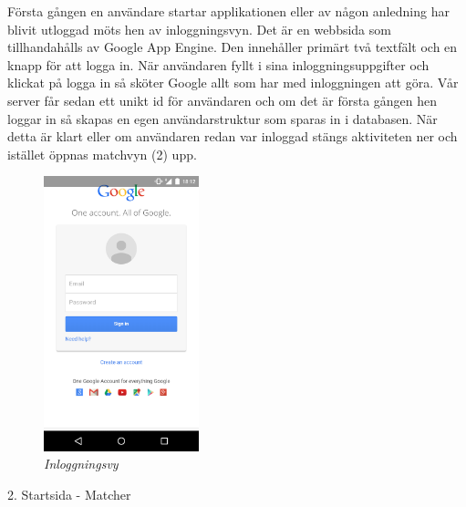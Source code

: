 \documentclass[a4paper, 11pt]{article}
\begin{document}
Första gången en användare startar applikationen eller av någon anledning har blivit utloggad möts hen av inloggningsvyn. Det är en webbsida som tillhandahålls av Google App Engine. Den innehåller primärt två textfält och en knapp för att logga in. När användaren fyllt i sina inloggningsuppgifter och klickat på logga in så sköter Google allt som har med inloggningen att  göra. Vår server får sedan ett unikt id för användaren och om det är första gången hen loggar in så skapas en egen användarstruktur som sparas in i databasen.
När detta är klart eller om användaren redan var inloggad stängs aktiviteten ner och istället öppnas matchvyn (2) upp. 
\begin{figure}[H]
	\begin{center}
	\includegraphics[width=0.4\textwidth]{app_login} 
	\end{center}
	\caption{\textit{Inloggningsvy}}
\end{figure}


\pagebreak
\large \textup{2. Startsida - Matcher}
\end{document}
